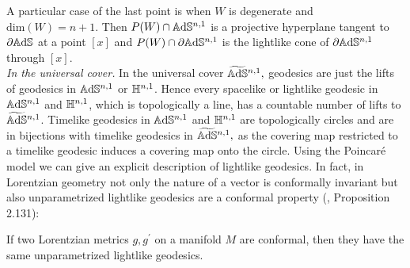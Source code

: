 A particular case of the last point is when $W$ is degenerate and $\text{dim}(W)=n+1.$ Then $P(W)\cap \mathbb{A}\mathrm{d}\mathbb{S}^{n,1}$ is a projective hyperplane tangent to $\partial\mathbb{A}\mathrm{d}\mathbb{S}$ at a point $[x]$ and $P(W)\cap \partial\mathbb{A}\mathrm{d}\mathbb{S}^{n,1}$ is the lightlike cone of $\partial\mathbb{A}\mathrm{d}\mathbb{S}^{n,1}$ through $[x]$.\\

\textit{In the universal cover.} In the universal cover $\widetilde{\mathbb{A}\mathrm{d}\mathbb{S}}{}^{n,1},$ geodesics are just the lifts of geodesics in $\mathbb{A}\mathrm{d}\mathbb{S}^{n,1}$ or $\mathbb{H}^{n,1}$. Hence every spacelike or lightlike geodesic in $\mathbb{A}\mathrm{d}\mathbb{S}^{n,1}$ and $\mathbb{H}^{n,1}$, which is topologically a line, has a countable number of lifts to $\widetilde{\mathbb{A}\mathrm{d}\mathbb{S}}{}^{n,1}$. Timelike geodesics in $\mathbb{A}\mathrm{d}\mathbb{S}^{n,1}$ and $\mathbb{H}^{n,1}$ are topologically circles and are in bijections with timelike geodesics in $\widetilde{\mathbb{A}\mathrm{d}\mathbb{S}}{}^{n,1},$ as the covering map restricted to a timelike geodesic induces a covering map onto the circle. Using the Poincaré model we can give an explicit description of lightlike geodesics. In fact, in Lorentzian geometry not only the nature of a vector is conformally invariant but also unparametrized lightlike geodesics are a conformal property (\cite{Gallot}, Proposition 2.131): 
\begin{theorem}\label{ConformalMetric} If two Lorentzian metrics $g,g^{\prime} $ on a manifold $M$ are conformal, then they have the same unparametrized lightlike geodesics.
\end{theorem}

